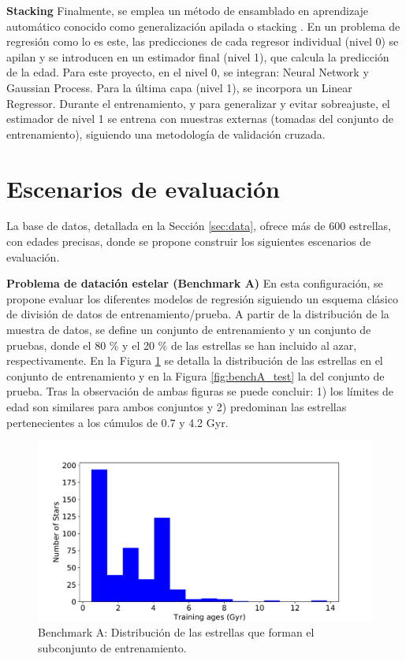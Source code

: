 \textbf{Stacking} {} Finalmente, se emplea un método de ensamblado en aprendizaje automático conocido como generalización apilada o stacking \cite{Wolpert1992}.  %
En un problema de regresión como lo es este, las predicciones de cada regresor individual (nivel 0) se apilan y se introducen en un estimador final (nivel 1), que calcula la predicción de la edad. Para este proyecto, en el nivel 0, se integran: Neural Network y Gaussian Process. Para la última capa (nivel 1), se incorpora un Linear Regressor. Durante el entrenamiento, y para generalizar y evitar sobreajuste, el estimador de nivel 1 se entrena con muestras externas (tomadas del conjunto de entrenamiento), siguiendo una metodología de validación cruzada.

\section{Escenarios de evaluación}
\label{sec:benchmark}

La base de datos, detallada en la Sección \ref{sec:data}, ofrece más de 600 estrellas, con edades precisas, donde se propone construir los siguientes escenarios de evaluación.

\vspace{0.5cm}

\textbf{Problema de datación estelar (Benchmark A)} {} En esta configuración, se propone evaluar los diferentes modelos de regresión siguiendo un esquema clásico de división de datos de entrenamiento/prueba. A partir de la distribución de la muestra de datos, se define un conjunto de entrenamiento y un conjunto de pruebas, donde el  80 \% y el 20 \% de las estrellas se han incluido al azar, respectivamente. En la Figura \ref{fig:benchA_train} se detalla la distribución de las estrellas en el conjunto de entrenamiento y en la Figura \ref{fig:benchA_test} la del conjunto de prueba. Tras la observación de ambas figuras se puede concluir: 1) los límites de edad son similares para ambos conjuntos y 2) predominan las estrellas pertenecientes a los cúmulos de 0.7 y 4.2 Gyr. 

\begin{figure}[H]
\begin{center}
 \includegraphics[width=0.8\linewidth]{Figuras/Experimentos/B_A_training.pdf}
\end{center}
\caption{Benchmark A: Distribución de las estrellas que forman el subconjunto de entrenamiento.}
 \label{fig:benchA_train}
\end{figure}

